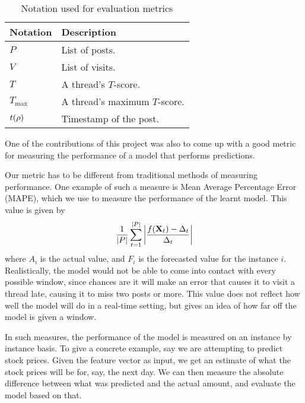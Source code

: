 \renewcommand{\P}{Pr}

%
\begin{table}
\begin{center}
\begin{tabular}{l l}
	\hline
Notation	&	Description		\\
	\hline
$P$			&	List of posts. \\
$V$			&	List of visits.\\
$T$			&	A thread's $T$-score. \\
	$T_\text{max}$	&	A thread's maximum $T$-score. \\
$t(\rho)$	&	Timestamp of the post.\\
	\hline
\end{tabular}
\end{center}
	\caption{Notation used for evaluation metrics}
\end{table}


One of the contributions of this project was also to come up with a good metric 
for measuring the performance of a model that performs predictions. 

Our metric has to be different from traditional methods of measuring 
performance. One example of such a measure is Mean Average Percentage Error 
(MAPE), which we use to measure the performance of the learnt model. This value 
is given by
\[
	\frac{1}{|P|}\sum^{|P|}_{t=1}\left|\frac{f(\mathbf{X}_t) - \Delta_t}{\Delta_t}\right|
\]
where $A_i$ is the actual value, and $F_i$ is the forecasted value for the 
instance $i$. Realistically, the model would not be able to come into contact 
with every possible window, since chances are it will make an error that causes 
it to visit a thread late, causing it to miss two posts or more. This value does 
not reflect how well the model will do in a real-time setting, but gives an idea 
of how far off the model is given a window.

In such measures, the performance of the model is measured on an instance by 
instance basis. To give a concrete example, say we are attempting to predict 
stock prices. Given the feature vector as input, we get an estimate of what the 
stock prices will be for, say, the next day. We can then measure the absolute 
difference between what was predicted and the actual amount, and evaluate the 
model based on that.


